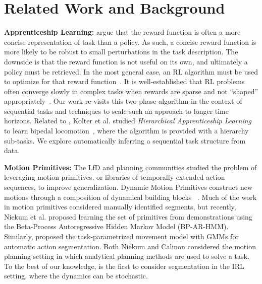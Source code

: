 %
\section{Related Work and Background}

\vspace{0.25em}\noindent\textbf{Apprenticeship Learning: } \cite{abbeel2004apprenticeship} argue that the reward function is often a more concise representation of task than a policy. As such, a concise reward function is more likely to be robust to small perturbations in the task description. 
The downside is that the reward function is not useful on its own, and ultimately a policy must be retrieved. In the most general case, an RL algorithm must be used to optimize for that reward function~\citep{abbeel2004apprenticeship}.
It is well-established that RL problems often converge slowly in complex tasks when rewards are sparse and not ``shaped'' appropriately~\citep{DBLP:conf/icml/NgHR99, DBLP:conf/aaai/JudahFTG14}.
Our work re-visits this two-phase algorithm in the context of sequential tasks and techniques to scale such an approach to longer time horizons.
Related to \hirl, Kolter et al. studied  \emph{Hierarchical Apprenticeship Learning} to learn bipedal locomotion~\citep{DBLP:conf/nips/KolterAN07}, where the algorithm is provided with a hierarchy sub-tasks.
We explore automatically inferring a sequential task structure from data.

\vspace{0.25em}\noindent\textbf{Motion Primitives: }The LfD and planning communities studied the problem of leveraging motion primitives, or libraries of temporally extended action sequences, to improve generalization. 
Dynamic Motion Primitives construct new motions through a composition of dynamical building blocks ~\citep{ijspreet2002learning,pastor2009learning,manschitz2015learning}.
Much of the work in motion primitives considered manually identified segments, but recently, Niekum et al. \citep{niekum2012learning} proposed learning the set of primitives from demonstrations using the Beta-Process Autoregressive Hidden Markov Model (BP-AR-HMM).
Similarly, \cite{calinon2014skills} proposed the task-parametrized movement model with GMMs for automatic action segmentation.
Both Niekum and Calinon considered the motion planning setting in which analytical planning methods are used to solve a task.
To the best of our knowledge, \hirl is the first to consider segmentation in the IRL setting, where the dynamics can be stochastic.

